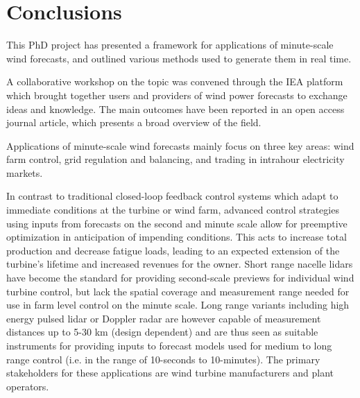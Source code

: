 \chapter{Conclusions}
\label{sec:conclusions}

\clearpage

This PhD project has presented a framework for applications of minute-scale wind forecasts, and outlined various methods used to generate them in real time.

A collaborative workshop on the topic was convened through the IEA platform which brought together users and providers of wind power forecasts to exchange ideas and knowledge. The main outcomes have been reported in an open access journal article, which presents a broad overview of the field.

Applications of minute-scale wind forecasts mainly focus on three key areas: wind farm control, grid regulation and balancing, and trading in intrahour electricity markets.

In contrast to traditional closed-loop feedback control systems which adapt to immediate conditions at the turbine or wind farm, advanced control strategies using inputs from forecasts on the second and minute scale allow for preemptive optimization in anticipation of impending conditions. This acts to increase total production and decrease fatigue loads, leading to an expected extension of the turbine's lifetime and increased revenues for the owner. Short range nacelle lidars have become the standard for providing second-scale previews for individual wind turbine control, but lack the spatial coverage and measurement range needed for use in farm level control on the minute scale. Long range variants including high energy pulsed lidar or Doppler radar are however capable of measurement distances up to 5-30 km (design dependent) and are thus seen as suitable instruments for providing inputs to forecast models used for medium to long range control (i.e. in the range of 10-seconds to 10-minutes). The primary stakeholders for these applications are wind turbine manufacturers and plant operators.

